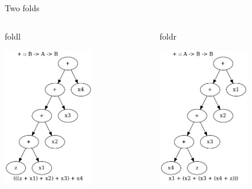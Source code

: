\documentclass[presentation,aspectratio=169,smaller]{beamer}
\begin{document}
\begin{frame}[label={sec:orga5c1330}]{Two folds}
\begin{columns}
\begin{column}[t]{0.5\columnwidth}
\begin{block}{foldl}
\begin{center}
\includegraphics[height=6cm]{.dot/foldl-1.png}
\end{center}
\end{block}
\end{column}

\begin{column}[t]{0.5\columnwidth}
\begin{block}{foldr}
\begin{center}
\includegraphics[height=6cm]{.dot/foldr-1.png}
\end{center}
\end{block}
\end{column}
\end{columns}
\end{frame}
\end{document}
